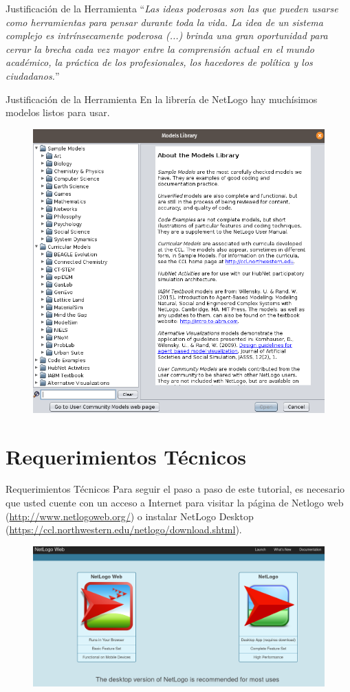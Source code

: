 \documentclass{beamer}
\begin{document}
\begin{frame}{Justificación de la Herramienta}
``\textit{Las ideas poderosas son las que pueden usarse como herramientas para pensar durante toda la vida. La idea de un sistema complejo es intrínsecamente poderosa (...) brinda una gran oportunidad para cerrar la brecha cada vez mayor entre la comprensión actual en el mundo académico, la práctica de los profesionales, los hacedores de política y los ciudadanos.}''\\
\cite[p. 2633]{Chen2020}
\end{frame}

\begin{frame}{Justificación de la Herramienta}
En la librería de NetLogo hay muchísimos modelos listos para usar.
\begin{figure}
\centering
\includegraphics[width=.6\textwidth]{biblioteca.png}
\end{figure}
\end{frame}

\section{Requerimientos Técnicos}
\begin{frame}{Requerimientos Técnicos}
Para seguir el paso a paso de este tutorial, es necesario que usted cuente con un acceso a Internet para visitar la página de Netlogo web  (\textcolor{blue}{\url{http://www.netlogoweb.org/}}) o instalar NetLogo Desktop (\textcolor{blue}{\url{https://ccl.northwestern.edu/netlogo/download.shtml}}).
\begin{figure}
\centering
\includegraphics[width=.7\textwidth]{netlogoWeb.png}
\end{figure}      
\end{frame}
\end{document}
